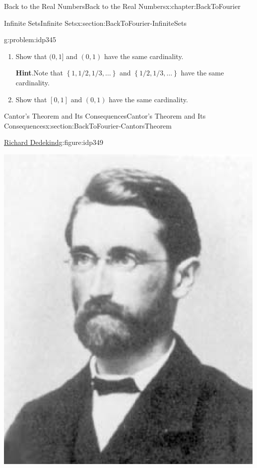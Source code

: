 \begin{chapterptx}{Back to the Real Numbers}{}{Back to the Real Numbers}{}{}{x:chapter:BackToFourier}
\begin{sectionptx}{Infinite Sets}{}{Infinite Sets}{}{}{x:section:BackToFourier-InfiniteSets}
\begin{problem}{}{g:problem:idp345}
\begin{enumerate}[font=\bfseries,label=(\alph*),ref=\alph*]
				\item{}Show that \((0,1]\) and \((0,1)\) have the same cardinality.%
				\par\smallskip%
				\noindent\textbf{\blocktitlefont Hint}.\hypertarget{g:hint:idp348}{}\quad{}Note that \(\left\{1,1/2,1/3,\ldots\right\}\) and \(\left\{1/2, 1/3, \ldots\right\}\) have the same cardinality.%
				\item{}Show that \([0,1]\) and \((0,1)\) have the same cardinality.%
			\end{enumerate}
		\end{problem}
	\end{sectionptx}
	\typeout{************************************************}
	\typeout{************************************************}
	\begin{sectionptx}{Cantor's Theorem and Its Consequences}{}{Cantor's Theorem and Its Consequences}{}{}{x:section:BackToFourier-CantorsTheorem}
		\begin{figureptx}{\href{https://mathshistory.st-andrews.ac.uk/Biographies/Dedekind/}{Richard Dedekind}\protect\footnotemark{}}{g:figure:idp349}{}%
			\begin{image}{0.325}{0.35}{0.325}%
				\includegraphics[width=\linewidth]{external/images/Dedekind.png}

\end{image}
\end{figureptx}
\end{sectionptx}
\end{chapterptx}
